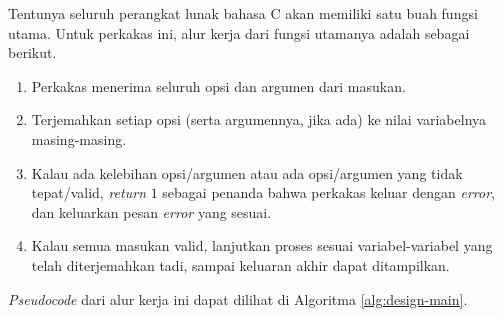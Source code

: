 Tentunya seluruh perangkat lunak bahasa C akan memiliki satu buah fungsi utama. Untuk perkakas ini, alur kerja dari fungsi utamanya adalah sebagai berikut.

\begin{enumerate}
	\item Perkakas menerima seluruh opsi dan argumen dari masukan.
	\item Terjemahkan setiap opsi (serta argumennya, jika ada) ke nilai variabelnya masing-masing.
	\item Kalau ada kelebihan opsi/argumen atau ada opsi/argumen yang tidak tepat/valid, \textit{return} $1$ sebagai penanda bahwa perkakas keluar dengan \textit{error}, dan keluarkan pesan \textit{error} yang sesuai.
	\item Kalau semua masukan valid, lanjutkan proses sesuai variabel-variabel yang telah diterjemahkan tadi, sampai keluaran akhir dapat ditampilkan.
\end{enumerate} 

\textit{Pseudocode} dari alur kerja ini dapat dilihat di Algoritma \ref{alg:design-main}.

